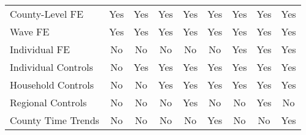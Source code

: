 \begin{tabular}{l*{1}cccccccc}
County-Level FE&         Yes         &         Yes         &         Yes         &         Yes         &         Yes      &         Yes         &         Yes         &         Yes         \\
Wave FE     &         Yes         &         Yes         &         Yes         &         Yes         &         Yes         &         Yes         &         Yes         &         Yes         \\
Individual FE&          No         &          No         &          No         &          No         &          No        &         Yes         &         Yes         &         Yes         \\
Individual Controls&          No         &         Yes         &         Yes         &         Yes         &         Yes &         Yes         &         Yes         &         Yes         \\
Household Controls&          No         &          No         &         Yes         &         Yes         &         Yes   &         Yes         &         Yes         &         Yes         \\
Regional Controls&          No         &          No         &          No         &         Yes         &          No    &          No         &         Yes         &          No         \\
County Time Trends&          No         &          No         &          No         &          No         &         Yes   &          No         &          No         &         Yes         \\





\bottomrule
\end{tabular}